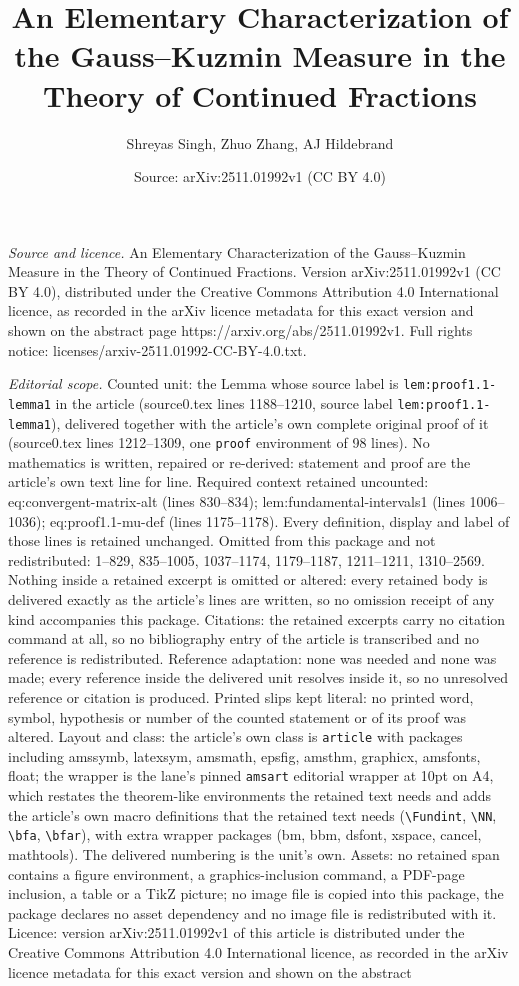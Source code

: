 \documentclass[10pt,a4paper]{amsart}
\title[An Elementary Characterization of the Gauss--Kuzmin Measure ]{An Elementary Characterization of the Gauss--Kuzmin Measure in the Theory of Continued Fractions}
\author{Shreyas Singh, Zhuo Zhang, AJ Hildebrand}
\date{Source: arXiv:2511.01992v1 (CC BY 4.0)}
\begin{document}
\maketitle

\noindent\emph{Source and licence.} An Elementary Characterization of the Gauss--Kuzmin Measure in the Theory of Continued Fractions. Version arXiv:2511.01992v1 (CC BY 4.0), distributed under the Creative Commons Attribution 4.0 International licence, as recorded in the arXiv licence metadata for this exact version and shown on the abstract page https://arxiv.org/abs/2511.01992v1. Full rights notice: licenses/arxiv-2511.01992-CC-BY-4.0.txt.\par\smallskip

\noindent\textit{Editorial scope.} Counted unit: the Lemma whose source label is \texttt{lem:proof1.1-lemma1} in the article (source0.tex lines 1188--1210, source label \texttt{lem:proof1.1-lemma1}), delivered together with the article's own complete original proof of it (source0.tex lines 1212--1309, one \texttt{proof} environment of 98 lines). No mathematics is written, repaired or re-derived: statement and proof are the article's own text line for line. Required context retained uncounted: eq:convergent-matrix-alt (lines 830--834); lem:fundamental-intervals1 (lines 1006--1036); eq:proof1.1-mu-def (lines 1175--1178). Every definition, display and label of those lines is retained unchanged. Omitted from this package and not redistributed: 1--829, 835--1005, 1037--1174, 1179--1187, 1211--1211, 1310--2569. Nothing inside a retained excerpt is omitted or altered: every retained body is delivered exactly as the article's lines are written, so no omission receipt of any kind accompanies this package. Citations: the retained excerpts carry no citation command at all, so no bibliography entry of the article is transcribed and no reference is redistributed. Reference adaptation: none was needed and none was made; every reference inside the delivered unit resolves inside it, so no unresolved reference or citation is produced. Printed slips kept literal: no printed word, symbol, hypothesis or number of the counted statement or of its proof was altered. Layout and class: the article's own class is \texttt{article} with packages including amssymb, latexsym, amsmath, epsfig, amsthm, graphicx, amsfonts, float; the wrapper is the lane's pinned \texttt{amsart} editorial wrapper at 10pt on A4, which restates the theorem-like environments the retained text needs and adds the article's own macro definitions that the retained text needs (\texttt{\textbackslash Fundint}, \texttt{\textbackslash NN}, \texttt{\textbackslash bfa}, \texttt{\textbackslash bfar}), with extra wrapper packages (bm, bbm, dsfont, xspace, cancel, mathtools). The delivered numbering is the unit's own. Assets: no retained span contains a figure environment, a graphics-inclusion command, a PDF-page inclusion, a table or a TikZ picture; no image file is copied into this package, the package declares no asset dependency and no image file is redistributed with it. Licence: version arXiv:2511.01992v1 of this article is distributed under the Creative Commons Attribution 4.0 International licence, as recorded in the arXiv licence metadata for this exact version and shown on the abstract 
\end{document}
